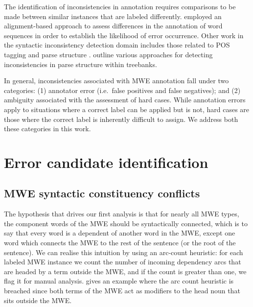 \documentclass[output=paper,modfonts,nonflat]{langsci/langscibook}
\begin{document}
The identification of inconsistencies in annotation requires comparisons to be made between similar instances that are labeled differently. \citet{boyd-et-al:07a} employed an alignment-based approach to assess differences in the annotation of \ngram word sequences in order to establish the likelihood of error occurrence.  Other work in the syntactic inconsistency detection domain includes those related to POS tagging \citep{loftsson2009correcting,Eskin:2000:DEW:974305.974325,ma2001line} and parse structure \citep{ule2004unexpected,kato2010correcting}. \citet{Dickinson03} outline various approaches for detecting inconsistencies in parse structure within treebanks. 

In general, inconsistencies associated with MWE annotation fall under two categories: (1) annotator error (i.e.\ false positives and false negatives); and (2) ambiguity associated with the assessment of hard cases. While annotation errors apply to situations where a correct label can be applied but is not, hard cases are those where the correct label is inherently difficult to assign. We address both these categories in this work.  

\section{Error candidate identification}

\subsection{MWE syntactic constituency conflicts}

The hypothesis that drives our first analysis is that for nearly all MWE types, the component words of the MWE should be syntactically connected, which is to say that every word is a dependent of another word in the MWE, except one word which connects the MWE to the rest of the sentence (or the root of the sentence). We can realise this intuition by using an arc-count heuristic: for each labeled MWE instance we count the number of incoming dependency arcs that are headed by a term outside the MWE, and if the count is greater than one, we flag it for manual analysis.  gives an example where the arc count heuristic is breached since both terms of the MWE  act as modifiers to the head noun that sits outside the MWE.
\end{document}
